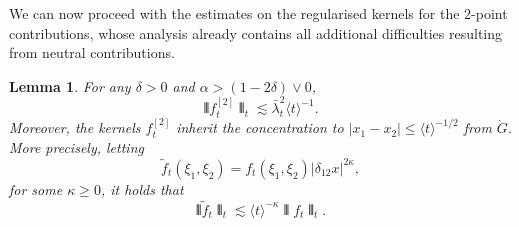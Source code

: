 \documentclass[11pt, a4paper]{scrartcl}
\numberwithin{equation}{section}
\theoremstyle{plain}
\newtheorem{lemma}[foo]{Lemma}
\theoremstyle{remark}
\begin{document}
We can now proceed with the estimates on the regularised kernels for the $2$-point contributions, whose analysis already contains all additional
difficulties resulting from neutral contributions.

\begin{lemma}
  \label{lem:f2-kernel-scaling}For any $\delta > 0$ and $\alpha > (1 - 2
  \delta) \vee 0$,
  \begin{equation}
    \interleave f_t^{[2]} \interleave_t \lesssim \bar{\lambda}_t^2 \langle t
    \rangle^{- 1} . \label{eq:f2-bounds}
  \end{equation}
  Moreover, the kernels $f^{[2]}_t$ inherit the concentration to $| x_1 - x_2
  | \leqslant \langle t \rangle^{- 1 / 2}$ from $\dot{G}$. More precisely,
  letting
  \[ \tilde{f}_t (\xi_1, \xi_2) = f_t (\xi_1, \xi_2) | \delta_{12} x |^{2
     \kappa}, \]
  for some $\kappa \geqslant 0$, it holds that
  \begin{equation}
    \interleave \tilde{f}_t \interleave_t \lesssim \langle t \rangle^{-
    \kappa} \interleave f_t \interleave_t . \label{eq:coeff-concentration}
  \end{equation}
\end{lemma}
\end{document}
